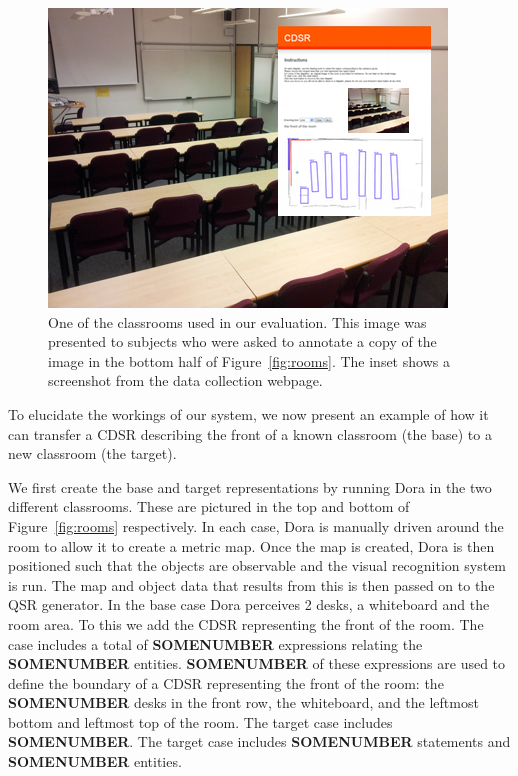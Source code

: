 \documentclass[letterpaper]{article}
\begin{document}
\begin{figure}
  \includegraphics[width=\columnwidth]{images/ug40.png}
  \caption{One of the classrooms used in our evaluation. This image was presented to subjects who were asked to annotate a copy of the image in the bottom half of Figure~\ref{fig:rooms}. The inset shows a screenshot from the data collection webpage.}
  \label{fig:ug40}
\end{figure}



To elucidate the workings of our system, we now present an example of how it can transfer a CDSR describing the front of a known classroom (the base) to a new classroom (the target). 

We first create the base and target representations by running Dora in the two different classrooms. These are pictured in the top and bottom of Figure~\ref{fig:rooms} respectively. In each case, Dora is manually driven around the room to allow it to create a metric map. Once the map is created, Dora is then positioned such that the objects are observable and the visual recognition system is run. The map and object data that results from this is then passed on to the QSR generator. In the base case Dora perceives 2 desks, a whiteboard and the room area. To this we add the CDSR representing the front of the room. The case includes a total of \textbf{SOMENUMBER} expressions relating the \textbf{SOMENUMBER} entities. \textbf{SOMENUMBER} of these expressions are used to define the boundary of a CDSR representing the front of the room: the \textbf{SOMENUMBER} desks in the front row, the whiteboard, and the leftmost bottom and leftmost top of the room. The target case includes \textbf{SOMENUMBER}. The target case includes \textbf{SOMENUMBER} statements and \textbf{SOMENUMBER} entities.
\end{document}
